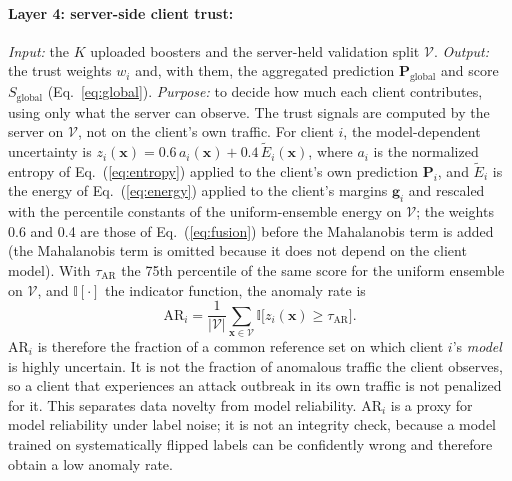 \documentclass[pdflatex,sn-mathphys-num]{sn-jnl}
\begin{document}
{\paragraph{Layer 4: server-side client trust:}
\emph{Input:} the $K$ uploaded boosters and the server-held validation split $\mathcal{V}$. \emph{Output:} the trust weights $w_i$ and, with them, the aggregated prediction $\mathbf{P}_{\mathrm{global}}$ and score $S_{\mathrm{global}}$ (Eq.~\ref{eq:global}). \emph{Purpose:} to decide how much each client contributes, using only what the server can observe. The trust signals are computed by the server on $\mathcal{V}$, not on the client's own traffic. For client $i$, the model-dependent uncertainty is $z_i(\mathbf{x})=0.6\,a_i(\mathbf{x})+0.4\,\tilde E_i(\mathbf{x})$, where $a_i$ is the normalized entropy of Eq.~(\ref{eq:entropy}) applied to the client's own prediction $\mathbf{P}_i$, and $\tilde E_i$ is the energy of Eq.~(\ref{eq:energy}) applied to the client's margins $\mathbf{g}_i$ and rescaled with the percentile constants of the uniform-ensemble energy on $\mathcal{V}$; the weights 0.6 and 0.4 are those of Eq.~(\ref{eq:fusion}) before the Mahalanobis term is added (the Mahalanobis term is omitted because it does not depend on the client model). With $\tau_{\mathrm{AR}}$ the 75th percentile of the same score for the uniform ensemble on $\mathcal{V}$, and $\mathbb{I}[\cdot]$ the indicator function, the anomaly rate is
\begin{equation}
\mathrm{AR}_i=\frac{1}{|\mathcal{V}|}\sum_{\mathbf{x}\in\mathcal{V}}\mathbb{I}\big[z_i(\mathbf{x})\geq\tau_{\mathrm{AR}}\big].\label{eq:ar}
\end{equation}
$\mathrm{AR}_i$ is therefore the fraction of a common reference set on which client $i$'s \emph{model} is highly uncertain. It is not the fraction of anomalous traffic the client observes, so a client that experiences an attack outbreak in its own traffic is not penalized for it. This separates data novelty from model reliability. $\mathrm{AR}_i$ is a proxy for model reliability under label noise; it is not an integrity check, because a model trained on systematically flipped labels can be confidently wrong and therefore obtain a low anomaly rate.

}
\end{document}
